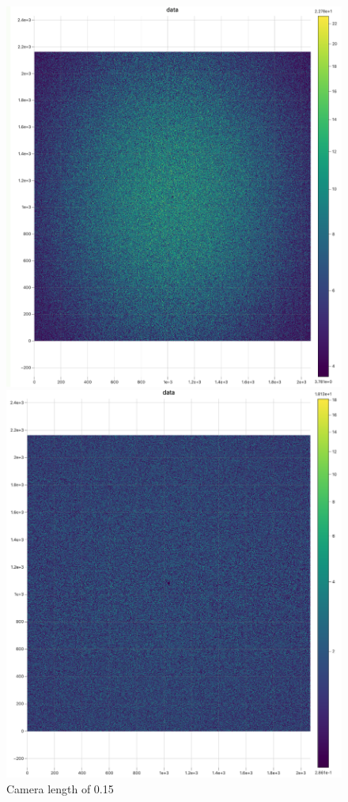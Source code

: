 \documentclass[12pt]{article}
\begin{document}
\begin{figure}[H]
    \centering
    \begin{minipage}{0.49\textwidth}
        \centering
        \includegraphics[width=\textwidth]{water01.png}
        \caption{Camera length of 0.15}
        \label{fig:water1}
    \end{minipage}
    \hfill
    \begin{minipage}{0.49\textwidth}
        \centering
        \includegraphics[width=\textwidth]{water07.png}

\end{minipage}
\end{figure}
\end{document}
